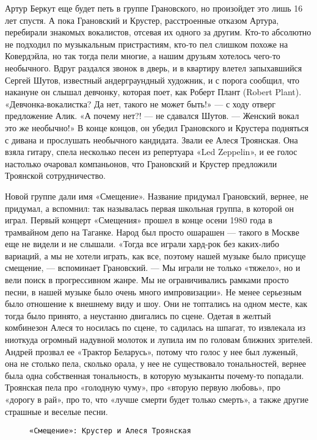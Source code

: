 Артур Беркут еще будет петь в группе Грановского, но произойдет это лишь 16 лет спустя. А пока Грановский и Крустер,
расстроенные отказом Артура, перебирали знакомых вокалистов, отсевая их одного за другим. Кто-то абсолютно не подходил
по музыкальным пристрастиям, кто-то пел слишком похоже на Ковердэйла, но так тогда пели многие, а нашим друзьям хотелось
чего-то необычного. Вдруг раздался звонок в дверь, и в квартиру влетел запыхавшийся Сергей Шутов, известный
андерграундный художник, и с порога сообщил, что накануне он слышал девчонку, которая поет, как Роберт Плант (Robert
Plant). «Девчонка-вокалистка? Да нет, такого не может быть!» — с ходу отверг предложение Алик. «А почему нет?! — не
сдавался Шутов. — Женский вокал это же необычно!» В конце концов, он убедил Грановского и Крустера подняться с дивана и
прослушать необычного кандидата. Звали ее Алеся Троянская. Она взяла гитару, спела несколько песен из репертуара «Led
Zeppelin», и ее голос настолько очаровал компаньонов, что Грановский и Крустер предложили Троянской сотрудничество.

Новой группе дали имя «Смещение». Название придумал Грановский, вернее, не придумал, а вспомнил: так называлась первая
школьная группа, в которой он играл. Первый концерт «Смещения» прошел в конце осени 1980 года в трамвайном депо на
Таганке. Народ был просто ошарашен — такого в Москве еще не видели и не слышали. «Тогда все играли хард-рок без
каких-либо вариаций, а мы не хотели играть, как все, поэтому нашей музыке было присуще смещение, — вспоминает
Грановский. — Мы играли не только «тяжело», но и вели поиск в прогрессивном жанре. Мы не ограничивались рамками просто
песни, в нашей музыке было очень много импровизации». Не менее серьезным было отношение к внешнему виду и шоу. Они не
топтались на одном месте, как тогда было принято, а неустанно двигались по сцене. Одетая в желтый комбинезон Алеся то
носилась по сцене, то садилась на шпагат, то извлекала из ниоткуда огромный надувной молоток и лупила им по головам
ближних зрителей. Андрей прозвал ее «Трактор Беларусь», потому что голос у нее был луженый, она не столько пела, сколько
орала, у нее не существовало тональностей, вернее была одна собственная тональность, в которую музыканты почему-то
попадали. Троянская пела про «голодную чуму», про «вторую первую любовь», про «дорогу в рай», про то, что «лучше смерти
будет только смерть», а также другие страшные и веселые песни.

\begin{wrapfigure}{L}{0.5\textwidth}
    \centering
    \caption{\texttt{«Смещение»: Крустер и Алеся Троянская}}
\end{wrapfigure}

